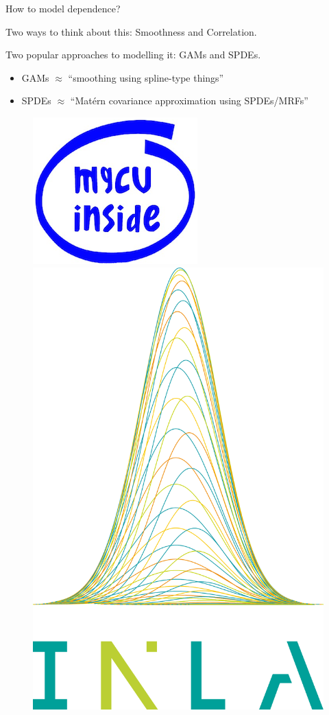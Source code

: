 \documentclass{beamer}
\begin{document}
\begin{frame}{How to model dependence?} 

Two ways to think about this: Smoothness and Correlation. 

Two popular approaches to modelling it: GAMs and SPDEs. 

\begin{itemize}
\item GAMs $\approx$ ``smoothing using spline-type things''
\item SPDEs $\approx$ ``Mat\'ern covariance approximation using SPDEs/MRFs'' 
\end{itemize}

  \begin{figure}[h]
    \begin{center}
      \includegraphics[height=0.3\textheight]{figures/mgcv-inside.png}
            \includegraphics[height=0.3\textheight]{figures/inla.png}

\end{center}
\end{figure}
\end{frame}
\end{document}
